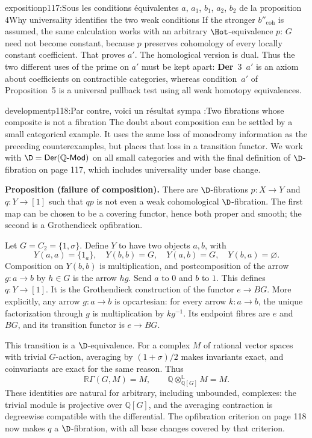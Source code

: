 \begin{dcomment}{exposition}{p117:Sous les conditions équivalentes $a$, $a_1$, $b_1$, $a_2$, $b_2$ de la proposition 4}{Why universality identifies the two weak conditions}
If the stronger $b''_{\mathrm{coh}}$ is assumed, the same calculation works with an arbitrary $\Hot$-equivalence $p$: $G$ need not become constant, because $p$ preserves cohomology of every locally constant coefficient. That proves $a'$. The homological version is dual. Thus the two different uses of the prime on $a'$ must be kept apart: \textbf{Der}~3~$a'$ is an axiom about coefficients on contractible categories, whereas condition~$a'$ of Proposition~5 is a universal pullback test using all weak homotopy equivalences.
\end{dcomment}

\begin{dcomment}{development}{p118:Par contre, voici un résultat sympa :}{Two fibrations whose composite is not a fibration}
The doubt about composition can be settled by a small categorical example. It uses the same loss of monodromy information as the preceding counterexamples, but places that loss in a transition functor. We work with $\D=\mathsf{Der}(\mathbb Q\text{-}\mathsf{Mod})$ on all small categories and with the final definition of $\D$-fibration on page 117, which includes universality under base change.

\textbf{Proposition (failure of composition).}\ours
There are $\D$-fibrations $p:X\to Y$ and $q:Y\to[1]$ such that $qp$ is not even a weak cohomological $\D$-fibration. The first map can be chosen to be a covering functor, hence both proper and smooth; the second is a Grothendieck opfibration.

Let $G=C_2=\{1,\sigma\}$. Define $Y$ to have two objects $a,b$, with
\[
 Y(a,a)=\{1_a\},\quad Y(b,b)=G,\quad
 Y(a,b)=G,\quad Y(b,a)=\varnothing.
\]
Composition on $Y(b,b)$ is multiplication, and postcomposition of the arrow $g:a\to b$ by $h\in G$ is the arrow $hg$. Send $a$ to $0$ and $b$ to $1$. This defines $q:Y\to[1]$. It is the Grothendieck construction of the functor $e\to BG$. More explicitly, any arrow $g:a\to b$ is opcartesian: for every arrow $k:a\to b$, the unique factorization through $g$ is multiplication by $kg^{-1}$. Its endpoint fibres are $e$ and $BG$, and its transition functor is $e\to BG$.

This transition is a $\D$-equivalence. For a complex $M$ of rational vector spaces with trivial $G$-action, averaging by $(1+\sigma)/2$ makes invariants exact, and coinvariants are exact for the same reason. Thus
\[
 \mathbb R\Gamma(G,M)=M,
 \qquad \mathbb Q\mathbin{\otimes^{\mathbb L}_{\mathbb Q[G]}}M=M.
\]
These identities are natural for arbitrary, including unbounded, complexes: the trivial module is projective over $\mathbb Q[G]$, and the averaging contraction is degreewise compatible with the differential. The opfibration criterion on page 118 now makes $q$ a $\D$-fibration, with all base changes covered by that criterion.


\end{dcomment}

